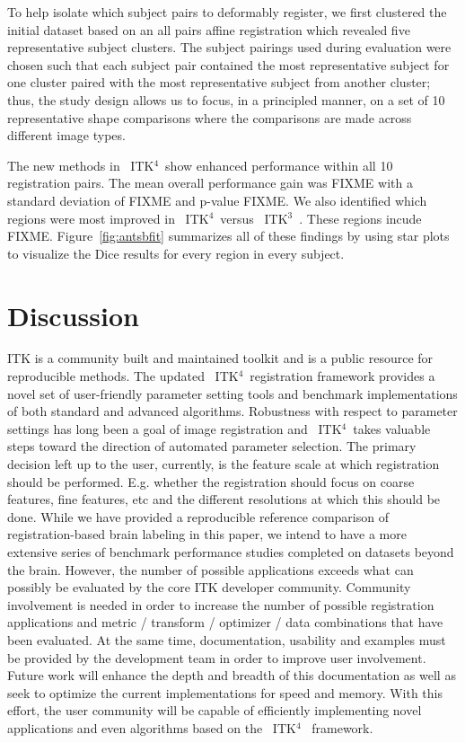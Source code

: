 \documentclass{frontiersSCNS}
\newcommand{\tk}{~ITK$^{\text{4}}$~}
\newcommand{\tkt}{~ITK$^{\text{3}}$~}
\begin{document}
To help isolate which subject pairs to deformably register, 
we first clustered the initial dataset based on an all pairs
affine registration which revealed five representative subject
clusters.   The subject pairings used during evaluation were chosen 
such that each subject pair contained the most representative subject
for one cluster paired with the most representative subject from
another cluster; thus, the study design allows us to focus, in a
principled manner, on a set of 10 representative shape comparisons
where the comparisons are made across different image types.

The new methods in \tk show enhanced performance 
within all 10 registration pairs.   The mean overall performance gain
was FIXME with a standard deviation of FIXME and p-value FIXME.   We
also identified which regions were most improved in \tk versus \tkt.
These regions incude FIXME.   Figure~\ref{fig:antsbfit} summarizes all
of these findings by using star plots to visualize the Dice results
for every region in every subject.

\section{Discussion} 
ITK is a community built and maintained toolkit and is a public
resource for reproducible methods.  The updated \tk registration
framework provides a novel set of user-friendly parameter setting
tools and benchmark implementations of both standard and advanced
algorithms.  Robustness with respect to parameter settings has long
been a goal of image registration and \tk takes valuable steps toward
the direction of automated parameter selection.  The primary decision
left up to the user, currently, is the feature scale at which
registration should be performed.  E.g. whether the registration should focus on coarse features, fine
features, etc and the different resolutions at which this should be
done.  While we have provided a reproducible reference comparison of
registration-based brain labeling in this paper, we intend to have a more extensive series of benchmark performance studies
completed on datasets beyond the brain.  However, the number of
possible applications exceeds what can possibly be evaluated by the
core ITK developer community.  Community involvement is needed in order to increase the
number of possible registration applications and metric / transform /
optimizer / data combinations that have been evaluated.  At the same
time, documentation, usability and examples must be provided by the
development team in order to improve user involvement.  Future work
will enhance the depth and breadth of this documentation as well as
seek to optimize the current implementations for speed and memory.
With this effort, the user community will be capable of efficiently
implementing novel applications and even algorithms based on the \tk
framework.
\end{document}

